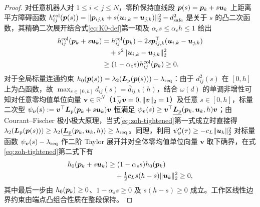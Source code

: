 \begin{proof}
对任意机器人对 $1\le i<j\le N$，零阶保持直线段 $\boldsymbol{p}(s)=\boldsymbol{p}_k+s\boldsymbol{u}_k$ 上距离平方障碍函数 $h_{ij}^{\mathrm{col}}(\boldsymbol{p}(s))=\lVert\boldsymbol{p}_{ij,k}+s(\boldsymbol{u}_{i,k}-\boldsymbol{u}_{j,k})\rVert_2^2-d_{\mathrm{safe}}^2$ 是关于 $s$ 的凸二次函数，其精确二次展开结合式\eqref{eq:K0-def}第一项及 $\alpha_c s\le\alpha_c h\le 1$ 给出
\begin{equation}
\begin{split}
 h_{ij}^{\mathrm{col}}(\boldsymbol{p}_k+s\boldsymbol{u}_k)&=h_{ij}^{\mathrm{col}}(\boldsymbol{p}_k)+2s\boldsymbol{p}_{ij,k}^{\top}(\boldsymbol{u}_{i,k}-\boldsymbol{u}_{j,k})\\
 &\quad+s^2\lVert\boldsymbol{u}_{i,k}-\boldsymbol{u}_{j,k}\rVert_2^2\\
 &\ge(1-\alpha_c s)h_{ij}^{\mathrm{col}}(\boldsymbol{p}_k)\ge 0.
\end{split}
\end{equation}
对于全局标量连通约束 $h_0(\boldsymbol{p}(s))=\lambda_2(\boldsymbol{L}_{\mathrm{p}}(\boldsymbol{p}(s)))-\lambda_{\mathrm{req}}$：由于 $d_{ij}^2(s)$ 在 $[0,h]$ 上为凸函数，故 $\max_{s\in[0,h]}d_{ij}(s)=\bar d_{ij,k}(h)$，结合 $\omega(d)$ 的单调非增性可知对任意零均值单位向量 $\boldsymbol v\in\mathbb R^N$（$\boldsymbol 1_N^{\top}\boldsymbol v=0,\lVert\boldsymbol v\rVert_2=1$）及任意 $s\in[0,h]$，标量二次型 $\psi_{\boldsymbol v}(s):=\boldsymbol v^{\top}\boldsymbol{L}_{\mathrm{p}}(\boldsymbol{p}_k+s\boldsymbol{u}_k)\boldsymbol v$ 恒满足 $\psi_{\boldsymbol v}(s)\ge\boldsymbol v^{\top}\underline{\boldsymbol{L}_{\mathrm{p}}}(\boldsymbol{p}_k,\boldsymbol{u}_k,h)\boldsymbol v$；由 Courant–Fischer 极小极大原理，当式\eqref{eq:zoh-tightened}第一式成立时直接得 $\lambda_2(\boldsymbol{L}_{\mathrm{p}}(\boldsymbol{p}(s)))\ge\lambda_2(\underline{\boldsymbol{L}_{\mathrm{p}}}(\boldsymbol{p}_k,\boldsymbol{u}_k,h))\ge\lambda_{\mathrm{req}}$。同理，利用 $\psi_{\boldsymbol v}''(\tau)\ge -c_L\lVert\boldsymbol{u}_k\rVert_2^2$ 对标量函数 $\psi_{\boldsymbol v}(s)-\lambda_{\mathrm{req}}$ 作二阶 Taylor 展开并对全体零均值单位向量 $\boldsymbol v$ 取下确界，在式\eqref{eq:zoh-tightened}第二式下有
\begin{equation}
\begin{split}
 h_0(\boldsymbol{p}_k+s\boldsymbol{u}_k)&\ge(1-\alpha_s s)h_0(\boldsymbol{p}_k)\\
 &\quad+\tfrac12 c_L s(h-s)\lVert\boldsymbol{u}_k\rVert_2^2\ge 0,
\end{split}
\end{equation}
其中最后一步由 $h_0(\boldsymbol{p}_k)\ge 0$、$1-\alpha_s s\ge 0$ 及 $s(h-s)\ge 0$ 成立。工作区线性边界约束由端点凸组合性质在整段保持。
\end{proof}

